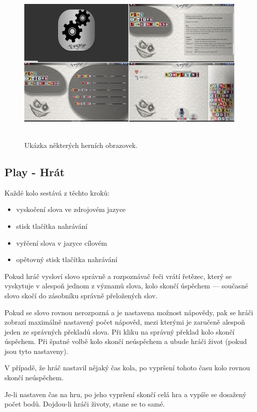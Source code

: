 \begin{figure}[h]
	\centering
	\includegraphics[width=140mm,height=80mm]{img/trogasr.jpg}
	\caption{Ukázka některých herních obrazovek.}
	\label{fig:trogasr}
\end{figure}

\subsection{Play - Hrát}

Každé kolo sestává z těchto kroků:

\begin{itemize}
\item vyskočení slova ve zdrojovém jazyce
\item stisk tlačítka nahrávání
\item vyřčení slova v jazyce cílovém
\item opětovný stisk tlačítka nahrávání
\end{itemize}

Pokud hráč vysloví slovo správně a rozpoznávač řeči vrátí řetězec, který se vyskytuje v alespoň jednom z významů slova, kolo skončí úspěchem --- současné slovo skočí do zásobníku správně přeložených slov.

Pokud se slovo rovnou nerozpozná a je nastavena možnost nápovědy, pak se hráči zobrazí maximálně nastavený počet nápověd, mezi kterými je zaručeně alespoň jeden ze správných překladů slova. Při kliku na správný překlad kolo skončí úspěchem. Při špatné volbě kolo skončí neúspěchem a ubude hráči život (pokud jsou tyto nastaveny).

V případě, že hráč nastavil nějaký čas kola, po vypršení tohoto času kolo rovnou skončí neúspěchem.

Je-li nastaven čas na hru, po jeho vypršení skončí celá hra a vypíše se dosažený počet bodů. Dojdou-li hráči životy, stane se to samé.

